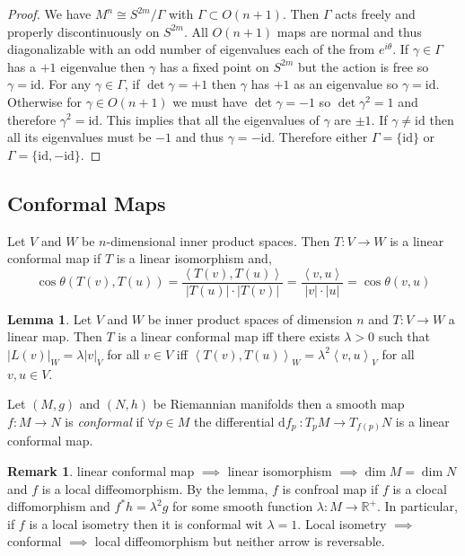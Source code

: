 \documentclass[12pt]{extarticle}
\newcommand{\R}{\mathbb{R}}
\newcommand{\id}{\mathrm{id}}
\renewcommand{\d}[1]{ \mathrm{d}#1 \:}
\theoremstyle{definition}
\newtheorem{lemma}[theorem]{Lemma}
\newtheorem{remark}{Remark}
\newenvironment{definition}[1][Definition:]{\begin{trivlist}
\item[\hskip \labelsep {\bfseries #1}]}{\end{trivlist}}
\begin{document}
\begin{proof}
We have $M^n \cong S^{2m} / \Gamma$ with $\Gamma \subset O(n+1)$. Then $\Gamma$ acts freely and properly discontinuously on $S^{2m}$. All $O(n+1)$ maps are normal and thus diagonalizable with an odd number of eigenvalues each of the from $e^{i \theta}$. If $\gamma \in \Gamma$ has a $+1$ eigenvalue then $\gamma$ has a fixed point on $S^{2m}$ but the action is free so $\gamma = \id$. For any $\gamma \in \Gamma$, if $\det{\gamma} = +1$ then $\gamma$ has $+1$ as an eigenvalue so $\gamma = \id$. Otherwise for $\gamma \in O(n+1)$ we must have $\det{\gamma} = - 1$ so $\det{\gamma^2} = 1$ and therefore $\gamma^2 = \id$. This implies that all the eigenvalues of $\gamma$ are $\pm 1$. If $\gamma \neq \id$ then all its eigenvalues must be $-1$ and thus $\gamma = - \id$. Therefore either $\Gamma = \{\id\}$ or $\Gamma = \{\id, -\id\}$. 
\end{proof}

\subsection{Conformal Maps}

\newcommand{\inner}[2]{\left< #1 , #2 \right>}

\begin{definition}
Let $V$ and $W$ be $n$-dimensional inner product spaces. Then $T : V \to W$ is a linear conformal map if $T$ is a linear isomorphism and,
\[ \cos{\theta(T(v), T(u))} = \frac{\inner{T(v)}{T(u)}}{|T(u)|\cdot |T(v)|} = \frac{\inner{v}{u}}{|v| \cdot |u|} = \cos{\theta(v, u)} \]
\end{definition}

\begin{lemma}
Let $V$ and $W$ be inner product spaces of dimension $n$ and $T : V \to W$ a linear map. Then $T$ is a linear conformal map iff there exists $\lambda > 0$ such that $|L(v)|_W = \lambda |v|_V$ for all $v \in V$ iff $\inner{T(v)}{T(u)}_W = \lambda^2 \inner{v}{u}_V$ for all $v,u \in V$. 
\end{lemma}

\begin{definition}
Let $(M, g)$ and $(N, h)$ be Riemannian manifolds then a smooth map $f : M \to N$ is \textit{conformal} if $\forall p \in M$ the differential $\d{f_p} : T_p M \to T_{f(p)} N$ is a linear conformal map.
\end{definition}

\begin{remark} 
linear conformal map $\implies$ linear isomorphism $\implies \dim{M} = \dim{N}$ and $f$ is a local diffeomorphism. By the lemma, $f$ is  confroal map if $f$ is a clocal diffomorphism and $f^*h = \lambda^2 g$ for some smooth function $\lambda : M \to \R^+$. In particular, if $f$ is a local isometry then it is conformal wit $\lambda = 1$. Local isometry $\implies$ conformal $\implies$ local diffeomorphism but neither arrow is reversable. 
\end{remark}
\end{document}
